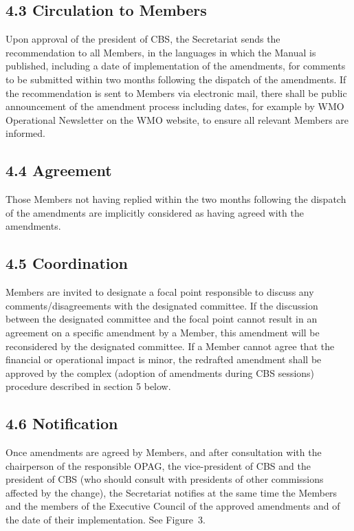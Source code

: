 \hypertarget{circulation-to-members}{%
\subsection{4.3 Circulation to Members}\label{circulation-to-members}}

Upon approval of the president of CBS, the Secretariat sends the recommendation to all Members, in the languages in which the Manual is published, including a date of implementation of the amendments, for comments to be submitted within two months following the dispatch of the amendments. If the recommendation is sent to Members via electronic mail, there shall be public announcement of the amendment process including dates, for example by WMO Operational Newsletter on the WMO website, to ensure all relevant Members are informed.

\hypertarget{agreement}{%
\subsection{4.4 Agreement}\label{agreement}}

Those Members not having replied within the two months following the dispatch of the amendments are implicitly considered as having agreed with the amendments.

\hypertarget{coordination}{%
\subsection{4.5 Coordination}\label{coordination}}

Members are invited to designate a focal point responsible to discuss any comments/disagreements with the designated committee. If the discussion between the designated committee and the focal point cannot result in an agreement on a specific amendment by a Member, this amendment will be reconsidered by the designated committee. If a Member cannot agree that the financial or operational impact is minor, the redrafted amendment shall be approved by the complex (adoption of amendments during CBS sessions) procedure described in section 5 below.

\hypertarget{notification}{%
\subsection{4.6 Notification}\label{notification}}

Once amendments are agreed by Members, and after consultation with the chairperson of the responsible OPAG, the vice-president of CBS and the president of CBS (who should consult with presidents of other commissions affected by the change), the Secretariat notifies at the same time the Members and the members of the Executive Council of the approved amendments and of the date of their implementation. See Figure~3.

